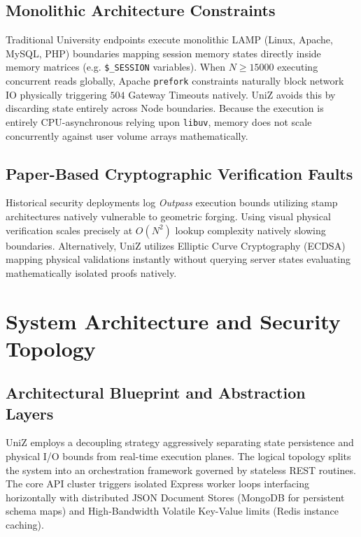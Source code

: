 \documentclass[journal,onecolumn,10pt,draftclsnofoot]{IEEEtran}
\begin{document}
\subsection{Monolithic Architecture Constraints}
Traditional University endpoints execute monolithic LAMP (Linux, Apache, MySQL, PHP) boundaries mapping session memory states directly inside memory matrices (e.g. \texttt{\$\_SESSION} variables). When $N \ge 15000$ executing concurrent reads globally, Apache \texttt{prefork} constraints naturally block network IO physically triggering $504$ Gateway Timeouts natively. 
UniZ avoids this by discarding state entirely across Node boundaries. Because the execution is entirely CPU-asynchronous relying upon \texttt{libuv}, memory does not scale concurrently against user volume arrays mathematically.

\subsection{Paper-Based Cryptographic Verification Faults}
Historical security deployments log \textit{Outpass} execution bounds utilizing stamp architectures natively vulnerable to geometric forging. Using visual physical verification scales precisely at $O(N^2)$ lookup complexity natively slowing boundaries. Alternatively, UniZ utilizes Elliptic Curve Cryptography (ECDSA) mapping physical validations instantly without querying server states evaluating mathematically isolated proofs natively. 

\newpage

\section{System Architecture and Security Topology}

\subsection{Architectural Blueprint and Abstraction Layers}
UniZ employs a decoupling strategy aggressively separating state persistence and physical I/O bounds from real-time execution planes. The logical topology splits the system into an orchestration framework governed by stateless REST routines. The core API cluster triggers isolated Express worker loops interfacing horizontally with distributed JSON Document Stores (MongoDB for persistent schema maps) and High-Bandwidth Volatile Key-Value limits (Redis instance caching).
\end{document}
